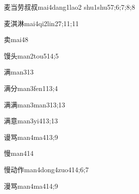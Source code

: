 \begin{verbete}{麦当劳叔叔}{mai4dang1lao2 shu1shu5}{7;6;7;8;8}
\end{verbete}

\begin{verbete}{麦淇淋}{mai4qi2lin2}{7;11;11}
\end{verbete}

\begin{verbete}{卖}{mai4}{8}
\end{verbete}

\begin{verbete}{馒头}{man2tou5}{14;5}
\end{verbete}

\begin{verbete}{满}{man3}{13}
\end{verbete}

\begin{verbete}{满分}{man3fen1}{13;4}
\end{verbete}

\begin{verbete}{满满}{man3man3}{13;13}
\end{verbete}

\begin{verbete}{满意}{man3yi4}{13;13}
\end{verbete}

\begin{verbete}{谩骂}{man4ma4}{13;9}
\end{verbete}

\begin{verbete}{慢}{man4}{14}
\end{verbete}

\begin{verbete}{慢动作}{man4dong4zuo4}{14;6;7}
\end{verbete}

\begin{verbete}{漫骂}{man4ma4}{14;9}
\end{verbete}

